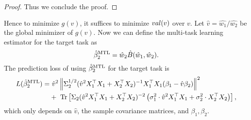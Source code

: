 \begin{proof}
Thus we conclude the proof.
\end{proof}

Hence to minimize $g(v)$, it suffices to minimize $val(v)$ over $v$.
Let $\hat v=\hat{w_1}/\hat{w_2}$ be the global minimizer of $g(v)$.
Now we can define the multi-task learning estimator for the target task as
	\[ \hat{\beta}_2^{\text{MTL}} = \hat{w}_{2}\hat{B}(\hat{w}_1, \hat{w}_2) .\]
The prediction loss of using $\hat{\beta}_2^{\text{MTL}}$ for the target task is
\begin{align}
	L(\hat{\beta}_2^{\text{MTL}}) =&~ \hat{v}^2 \left\| \Sigma_2^{1/2}(\hat{v}^2 X_1^{\top}X_1 + X_2^{\top}X_2)^{-1} X_1^{\top}X_1 (\beta_1 - \hat{v} \beta_2) \right\|^2 \nonumber \\
			&+~  \operatorname{Tr}\left[\Sigma_2(\hat{v}^2 X_1^{\top}X_1 + X_2^{\top}X_2)^{-2}\left(\sigma_1^2 \cdot \hat v^2  X_1^{\top}X_1 + \sigma_2^2  \cdot X_2^{\top}X_2\right) \right], \label{eq_te_mtl_2task}
\end{align}
which only depends on $\hat v$, the sample covariance matrices, and $\beta_1,\beta_2$.

